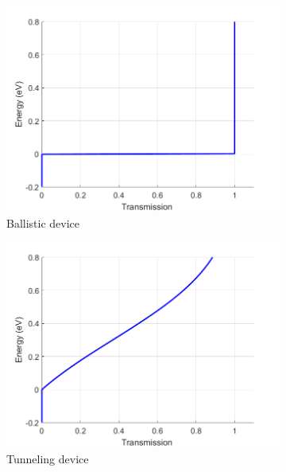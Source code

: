 \documentclass{beamer}
\begin{document}
{\begin{frame}
\begin{figure}
  \begin{subfigure}{0.3\textwidth}
    \includegraphics[width=\linewidth]{T_ballistic.png}
    \caption{\scriptsize Ballistic device}
  \end{subfigure}
  \begin{subfigure}{0.3\textwidth}
    \includegraphics[width=\linewidth]{T_tunnel.png}
    \caption{\scriptsize Tunneling device}
  \end{subfigure}
  \begin{subfigure}{0.3\textwidth}

\end{subfigure}
\end{figure}
\end{frame}}
\end{document}
